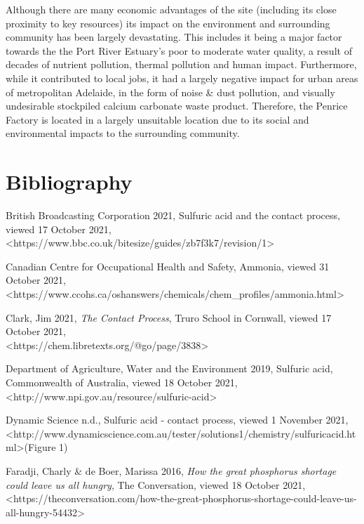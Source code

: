 \documentclass[12pt, a4paper]{article}
\begin{document}
Although there are many economic advantages of the site (including its close proximity to key resources) its impact on the environment and surrounding community has been largely devastating. This includes it being a major factor towards the the Port River Estuary's poor to moderate water quality, a result of decades of nutrient pollution, thermal pollution and human impact. Furthermore, while it contributed to local jobs, it had a largely negative impact for urban areas of metropolitan Adelaide, in the form of noise \& dust pollution, and visually undesirable stockpiled calcium carbonate waste product. Therefore, the Penrice Factory is located in a largely unsuitable location due to its social and environmental impacts to the surrounding community. 
\pagebreak

\section{Bibliography}

British Broadcasting Corporation 2021, Sulfuric acid and the contact process, viewed 17 October 2021, \\ \textless{https://www.bbc.co.uk/bitesize/guides/zb7f3k7/revision/1}\textgreater

Canadian Centre for Occupational Health and Safety, Ammonia, viewed 31 October 2021, \\ \textless{https://www.ccohs.ca/oshanswers/chemicals/chem\_profiles/ammonia.html}\textgreater

Clark, Jim 2021, \emph{The Contact Process}, Truro School in Cornwall, viewed 17 October 2021, \\ \textless{https://chem.libretexts.org/@go/page/3838}\textgreater

Department of Agriculture, Water and the Environment 2019, Sulfuric acid, Commonwealth of Australia, viewed 18 October 2021, \textless{http://www.npi.gov.au/resource/sulfuric-acid}\textgreater

Dynamic Science n.d., Sulfuric acid - contact process, viewed 1 November 2021, \\ \textless{http://www.dynamicscience.com.au/tester/solutions1/chemistry/sulfuricacid.html}\textgreater (Figure 1)

Faradji, Charly \& de Boer, Marissa 2016, \emph{How the great phosphorus shortage could leave us all hungry}, The Conversation, viewed 18 October 2021, \\ \textless{https://theconversation.com/how-the-great-phosphorus-shortage-could-leave-us-all-hungry-54432}\textgreater
\end{document}
